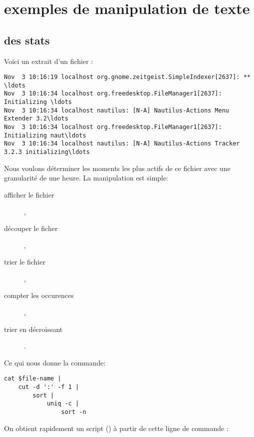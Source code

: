 
\section{exemples de manipulation de texte}

\subsection{des stats}
Voici un extrait d'un fichier :

\begin{lstlisting}
Nov  3 10:16:19 localhost org.gnome.zeitgeist.SimpleIndexer[2637]: ** \ldots
Nov  3 10:16:34 localhost org.freedesktop.FileManager1[2637]: Initializing \ldots
Nov  3 10:16:34 localhost nautilus: [N-A] Nautilus-Actions Menu Extender 3.2\ldots
Nov  3 10:16:34 localhost org.freedesktop.FileManager1[2637]: Initializing naut\ldots
Nov  3 10:16:34 localhost nautilus: [N-A] Nautilus-Actions Tracker 3.2.3 initializing\ldots
\end{lstlisting}

Nous voulons déterminer les moments les plus actifs de ce fichier avec une granularité de une heure.
La manipulation est simple:

\begin{description}
    \item[afficher le fichier] ,
    \item[découper le ficher] ,
    \item[trier le fichier] ,
    \item[compter les occurences] ,
    \item[trier en décroissant] .
\end{description}

Ce qui nous donne la commande:


\begin{lstlisting}
cat $file-name |
    cut -d ':' -f 1 |
        sort |
            uniq -c |
                sort -n
\end{lstlisting}

On obtient rapidement un script () à partir de cette ligne de commande :


%
%
%

